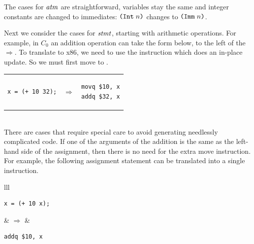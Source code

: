 \documentclass[11pt]{book}
\begin{document}
The cases for $\mathit{atm}$ are straightforward, variables stay
the same and integer constants are changed to immediates:
$\texttt{(Int}\;n\texttt{)}$ changes to $\texttt{(Imm}\;n\texttt{)}$.

Next we consider the cases for $\mathit{stmt}$, starting with arithmetic
operations. For example, in $C_0$ an addition operation can take the
form below, to the left of the $\Rightarrow$.  To translate to x86, we
need to use the  instruction which does an in-place
update. So we must first move  to . \\
\begin{tabular}{lll}
\begin{minipage}{0.4\textwidth}
\begin{lstlisting}
x = (+ 10 32);
\end{lstlisting}
\end{minipage}
&
$\Rightarrow$
&
\begin{minipage}{0.4\textwidth}
\begin{lstlisting}
movq $10, x
addq $32, x
\end{lstlisting}
\end{minipage}
\end{tabular} \\
%
There are cases that require special care to avoid generating
needlessly complicated code. If one of the arguments of the addition
is the same as the left-hand side of the assignment, then there is no
need for the extra move instruction.  For example, the following
assignment statement can be translated into a single 
instruction.\\
\begin{tabular}{lll}
\begin{minipage}{0.4\textwidth}
\begin{lstlisting}
x = (+ 10 x);
\end{lstlisting}
\end{minipage}
&
$\Rightarrow$
&
\begin{minipage}{0.4\textwidth}
\begin{lstlisting}
addq $10, x
\end{lstlisting}
\end{minipage}
\end{tabular} \\
\end{document}
